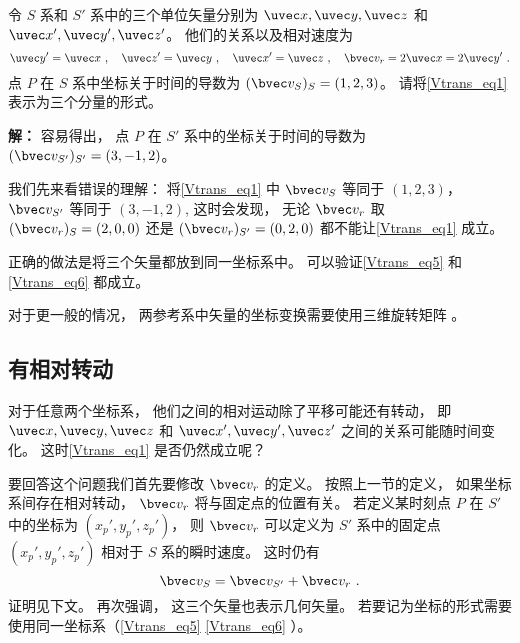 \begin{example}{}\label{Vtrans_ex2}
令 $S$ 系和 $S'$ 系中的三个单位矢量分别为 $\uvec x, \uvec y, \uvec z$ 和 $\uvec x', \uvec y', \uvec z'$。 他们的关系以及相对速度为
\begin{equation}
\uvec y' = \uvec x~, \quad
\uvec z' = \uvec y~, \quad
\uvec x' = \uvec z~, \quad
\bvec v_r = 2\uvec x = 2\uvec y'~.
\end{equation}
点 $P$ 在 $S$ 系中坐标关于时间的导数为 $(\bvec v_S)_S = (1, 2, 3)$。 请将\autoref{Vtrans_eq1} 表示为三个分量的形式。

\textbf{解：} 容易得出， 点 $P$ 在 $S'$ 系中的坐标关于时间的导数为 $(\bvec v_{S'})_{S'} = (3, -1, 2)$。

我们先来看错误的理解： 将\autoref{Vtrans_eq1} 中 $\bvec v_S$ 等同于 $(1, 2, 3)$， $\bvec v_{S'}$ 等同于 $(3, -1, 2)$,  这时会发现， 无论 $\bvec v_r$ 取 $(\bvec v_r)_S = (2, 0, 0)$ 还是 $(\bvec v_r)_{S'} = (0, 2, 0)$ 都不能让\autoref{Vtrans_eq1} 成立。

正确的做法是将三个矢量都放到同一坐标系中。 可以验证\autoref{Vtrans_eq5} 和\autoref{Vtrans_eq6} 都成立。

对于更一般的情况， 两参考系中矢量的坐标变换需要使用三维旋转矩阵 。
\end{example}

\subsection{有相对转动}
对于任意两个坐标系， 他们之间的相对运动除了平移可能还有转动， 即 $\uvec x, \uvec y, \uvec z$ 和 $\uvec x', \uvec y', \uvec z'$ 之间的关系可能随时间变化。 这时\autoref{Vtrans_eq1} 是否仍然成立呢？

要回答这个问题我们首先要修改 $\bvec v_r$ 的定义。 按照上一节的定义， 如果坐标系间存在相对转动， $\bvec v_r$ 将与固定点的位置有关。 若定义某时刻点 $P$ 在 $S'$ 中的坐标为 $(x_p', y_p', z_p')$， 则 $\bvec v_r$ 可以定义为 $S'$ 系中的固定点 $(x_p', y_p', z_p')$ 相对于 $S$ 系的瞬时速度。 这时仍有
\begin{equation}\label{Vtrans_eq2}
\bvec v_{S} = \bvec v_{S'} + \bvec v_r~.
\end{equation}
证明见下文。 再次强调， 这三个矢量也表示几何矢量。 若要记为坐标的形式需要使用同一坐标系（\autoref{Vtrans_eq5} \autoref{Vtrans_eq6} ）。


